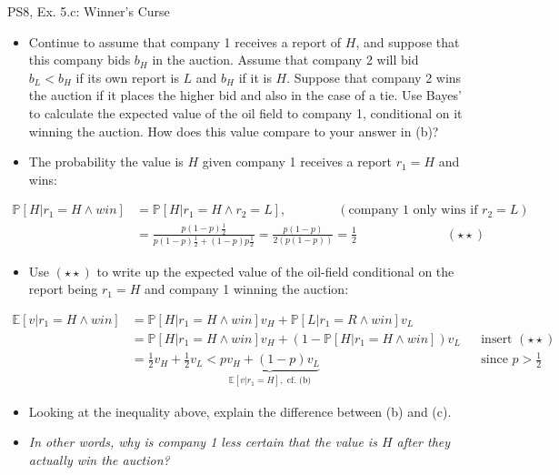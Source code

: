 \begin{frame}{PS8, Ex. 5.c: Winner's Curse}
      \begin{itemize}
        \item[(c)] Continue to assume that company 1 receives a report of $H$, and suppose that this company bids $b_H$ in the auction. Assume that company 2 will bid $b_L < b_H$ if its own report is $L$ and $b_H$ if it is $H$. Suppose that company 2 wins the auction if it places the higher bid and also in the case of a tie. Use Bayes’ to calculate the expected value of the oil field to company 1, conditional on it winning the auction. How does this value compare to your answer in (b)?
        \item[Step 1:] The probability the value is $H$ given company 1 receives a report $r_1=H$ and wins:
        \end{itemize}
        \vspace{-8pt}
        \begin{align*}
          \mathbb{P}[H|r_1=H\wedge win]&=\mathbb{P}[H|r_1=H\wedge r_2=L],\quad\quad\quad\quad(\text{company 1 only wins if }r_2=L)\\
            &=\frac{p(1-p)\frac{1}{2}}{p(1-p)\frac{1}{2}+(1-p)p\frac{1}{2}}=\frac{p(1-p)}{2(p(1-p))}=\frac{1}{2}\quad\quad\quad\quad\quad\quad\quad(\star\star)
        \end{align*}
        \vspace{-8pt}
        \begin{itemize}
        \item[Step 2:] Use $(\star\star)$ to write up the expected value of the oil-field conditional on the report being $r_1=H$ and company 1 winning the auction:
      \end{itemize}
      \vspace{-4pt}
      \begin{align*}
        \mathbb{E}[v|r_1=H\wedge win]&=\mathbb{P}[H|r_1=H\wedge win]v_H+\mathbb{P}[L|r_1=R\wedge win]v_L\\
        &=\mathbb{P}[H|r_1=H\wedge win]v_H+\left(1-\mathbb{P}[H|r_1=H\wedge win]\right)v_L&&\text{insert }(\star\star)\\
        &=\frac{1}{2}v_H+\frac{1}{2}v_L<\underbrace{pv_H+(1-p)v_L}_{\textstyle\mathbb{E}[v|r_1=H],\text{ cf. (b)}}&&\text{since }p>\frac{1}{2}
      \end{align*}
      \vspace{-10pt}
      \begin{itemize}
        \item[Step 3:] Looking at the inequality above, explain the difference between (b) and (c).
        \item[]        \textit{In other words, why is company 1 less certain that the value is $H$ after they actually win the auction?}
      \end{itemize}
      \vfill\null
\end{frame}
